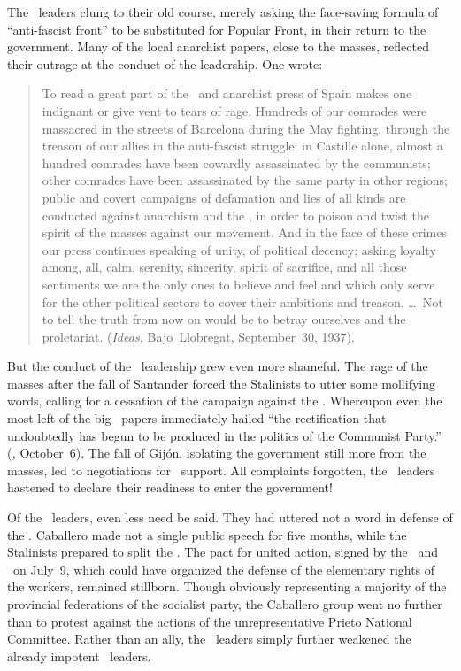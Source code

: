 The \CNT\ leaders clung to their old course, merely asking the face-saving formula of ``anti-fascist front'' to be substituted for Popular Front, in their return to the government. Many of the local anarchist papers, close to the masses, reflected their outrage at the conduct of the leadership. One wrote:

\begin{quotation}
  To read a great part of the \CNT\ and anarchist press of Spain makes one indignant or give vent to tears of rage. Hundreds of our comrades were massacred in the streets of Barcelona during the May fighting, through the treason of our allies in the anti-fascist struggle; in Castille alone, almost a hundred comrades have been cowardly assassinated by the communists; other comrades have been assassinated by the same party in other regions; public and covert campaigns of de\-fam\-a\-tion and lies of all kinds are conducted against anarchism and the \CNT\kn, in order to poison and twist the spirit of the masses against our movement. And in the face of these crimes our press continues speaking of unity, of political decency; asking loyalty among, all, calm, serenity, sincerity, spirit of sacrifice, and all those sentiments we are the only ones to believe and feel and which only serve for the other political sectors to cover their ambitions and treason. \dots\ Not to tell the truth from now on would be to betray ourselves and the proletariat. (\emph{Ideas,} Bajo~Llo\-bre\-gat, September~30, 1937).
\end{quotation}

But the conduct of the \CNT\ leadership grew even more shameful. The rage of the masses after the fall of Santander forced the Stalinists to utter some mollifying words, calling for a cessation of the campaign against the \CNT. Whereupon even the most left of the big \CNT\ papers immediately hailed ``the rectification that undoubtedly has begun to be produced in the politics of the Communist Party.'' (\emph{\CNT,} October~6). The fall of Gij\'on, isolating the government still more from the masses, led to negotiations for \CNT\ support. All complaints forgotten, the \CNT\ leaders hastened to declare their readiness to enter the government!

Of the \UGT\ leaders, even less need be said. They had uttered not a word in defense of the \POUM\kn. Caballero made not a single public speech for five months, while the Stalinists prepared to split the \UGT\kn. The pact for united action, signed by the \CNT\ and \UGT\ on July~9, which could have organized the defense of the elementary rights of the workers, remained stillborn. Though obviously representing a majority of the provincial federations of the socialist party, the Caballero group went no further than to protest against the actions of the unrepresentative Prieto National Committee. Rather than an ally, the \UGT\ leaders simply further weakened the already impotent \CNT\ leaders.

